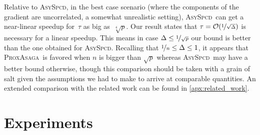 \documentclass{article}
\newcommand{\PASAGA}{\textsc{ProxAsaga}}
\newcommand{\AsySPCD}{\textsc{AsySpcd}}
\begin{document}
Relative to \AsySPCD, in the best case scenario (where the components of the gradient are uncorrelated, a somewhat unrealistic setting), \AsySPCD\ can get a near-linear speedup for~$\tau$ as big as~$\sqrt[4]{p}$.
Our result states that $\tau = \mathcal{O}(\nicefrac{1}{\sqrt{\Delta}})$ is necessary for a linear speedup.
%
%
This means in case $\Delta \leq \nicefrac{1}{\sqrt{p}}$ our bound is better than the one obtained for \AsySPCD.
%
Recalling that $\nicefrac{1}{n} \leq \Delta \leq 1$, it appears that \PASAGA\ is favored when $n$ is bigger than $\sqrt{p}$ whereas \AsySPCD\ may have a better bound otherwise, though this comparison should be taken with a grain of salt given the assumptions we had to make to arrive at comparable quantities.
An extended comparison with the related work can be found in \ref{apx:related_work}.

%





\section{Experiments} \label{scs:experiments}
\end{document}
